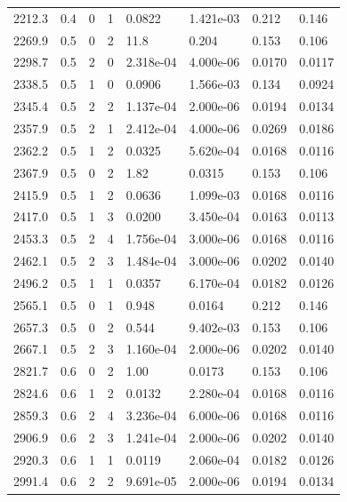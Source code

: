 \documentclass[preview]{standalone}
\begin{document}
{{{\begin{tabular}{L{1.2cm}C{1.2cm} C{0.3cm}C{0.5cm} C{1.4cm}C{1.4cm} C{1.4cm}C{1.4cm}}
  2212.3  &   0.4  & 0     &  1 &  0.0822  & 1.421e-03  & 0.212 &  0.146   \\ 
  2269.9  &   0.5  & 0     &  2 &  11.8  & 0.204  & 0.153 &  0.106   \\ 
  2298.7  &   0.5  & 2     &  0 &  2.318e-04  & 4.000e-06  & 0.0170 &  0.0117   \\ 
  2338.5  &   0.5  & 1     &  0 &  0.0906  & 1.566e-03  & 0.134 &  0.0924   \\ 
  2345.4  &   0.5  & 2     &  2 &  1.137e-04  & 2.000e-06  & 0.0194 &  0.0134   \\ 
  2357.9  &   0.5  & 2     &  1 &  2.412e-04  & 4.000e-06  & 0.0269 &  0.0186   \\ 
  2362.2  &   0.5  & 1     &  2 &  0.0325  & 5.620e-04  & 0.0168 &  0.0116   \\ 
  2367.9  &   0.5  & 0     &  2 &  1.82  & 0.0315  & 0.153 &  0.106   \\ 
  2415.9  &   0.5  & 1     &  2 &  0.0636  & 1.099e-03  & 0.0168 &  0.0116   \\ 
  2417.0  &   0.5  & 1     &  3 &  0.0200  & 3.450e-04  & 0.0163 &  0.0113   \\ 
  2453.3  &   0.5  & 2     &  4 &  1.756e-04  & 3.000e-06  & 0.0168 &  0.0116   \\ 
  2462.1  &   0.5  & 2     &  3 &  1.484e-04  & 3.000e-06  & 0.0202 &  0.0140   \\ 
  2496.2  &   0.5  & 1     &  1 &  0.0357  & 6.170e-04  & 0.0182 &  0.0126   \\ 
  2565.1  &   0.5  & 0     &  1 &  0.948  & 0.0164  & 0.212 &  0.146   \\ 
  2657.3  &   0.5  & 0     &  2 &  0.544  & 9.402e-03  & 0.153 &  0.106   \\ 
  2667.1  &   0.5  & 2     &  3 &  1.160e-04  & 2.000e-06  & 0.0202 &  0.0140   \\ 
  2821.7  &   0.6  & 0     &  2 &  1.00  & 0.0173  & 0.153 &  0.106   \\ 
  2824.6  &   0.6  & 1     &  2 &  0.0132  & 2.280e-04  & 0.0168 &  0.0116   \\ 
  2859.3  &   0.6  & 2     &  4 &  3.236e-04  & 6.000e-06  & 0.0168 &  0.0116   \\ 
  2906.9  &   0.6  & 2     &  3 &  1.241e-04  & 2.000e-06  & 0.0202 &  0.0140   \\ 
  2920.3  &   0.6  & 1     &  1 &  0.0119  & 2.060e-04  & 0.0182 &  0.0126   \\ 
  2991.4  &   0.6  & 2     &  2 &  9.691e-05  & 2.000e-06  & 0.0194 &  0.0134   \\ 

\end{tabular}}}}
\end{document}

